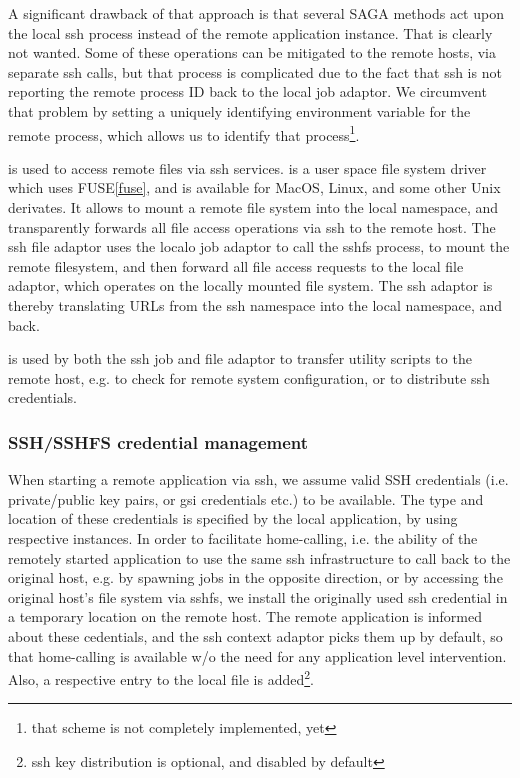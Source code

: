   A significant drawback of that approach is that several SAGA methods
  act upon the local ssh process instead of the remote application
  instance.  That is clearly not wanted.  Some of these operations can
  be mitigated to the remote hosts, via separate ssh calls, but that
  process is complicated due to the fact that ssh is not reporting the
  remote process ID back to the local job adaptor.  We circumvent that
  problem by setting a uniquely identifying environment variable for
  the remote process, which allows us to identify that
  process\footnote{that scheme is not completely implemented, yet}.

  \shfs is used to access remote files via ssh services.  \sshfs is a
  user space file system driver which uses FUSE\ref{fuse}, and is
  available for MacOS, Linux, and some other Unix derivates.  It
  allows to mount a remote file system into the local namespace, and
  transparently forwards all file access operations via ssh to the
  remote host.  The ssh file adaptor uses the localo job adaptor to
  call the sshfs process, to mount the remote filesystem, and then
  forward all file access requests to the local file adaptor, which
  operates on the locally mounted file system.  The ssh adaptor is
  thereby translating URLs from the ssh namespace into the local
  namespace, and back.

  \scp is used by both the ssh job and file adaptor to transfer
  utility scripts to the remote host, e.g. to check for remote system
  configuration, or to distribute ssh credentials.

  
  \subsubsection{SSH/SSHFS credential management}

   When starting a remote application via ssh, we assume valid SSH
   credentials (i.e. private/public key pairs, or gsi credentials
   etc.) to be available.  The type and location of these credentials
   is specified by the local application, by using respective
    instances.  In order to facilitate home-calling,
   i.e. the ability of the remotely started application to use the
   same ssh infrastructure to call back to the original host, e.g. by
   spawning jobs in the opposite direction, or by accessing the
   original host's file system via sshfs, we install the originally
   used ssh credential in a temporary location on the remote host.
   The remote application is informed about these cedentials, and the
   ssh context adaptor picks them up by default, so that home-calling
   is available w/o the need for any application level intervention.
   Also, a respective entry to the local  file is
   added\footnote{ssh key distribution is optional, and disabled by
   default}.

